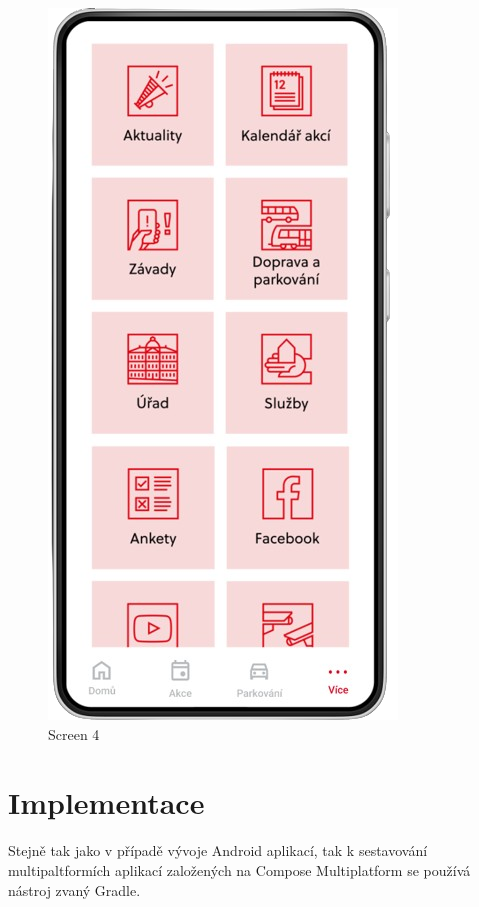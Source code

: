 \begin{figure}[H]
    \includegraphics[width=\linewidth]{screen4.png}
    \caption{Screen 4}\label{fig:screen4}
  \endminipage\hfill
\end{figure}

\chapter{Implementace}
Stejně tak jako v případě vývoje Android aplikací, tak k sestavování multipaltformích aplikací založených na Compose Multiplatform 
se používá nástroj zvaný Gradle.  

